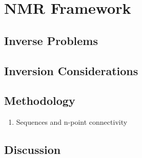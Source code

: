 
\chapter{NMR Framework}
\label{ch:03framework}

\FloatBarrier
\section{Inverse Problems}
\label{sec:inverse}


\FloatBarrier
\section{Inversion Considerations}
\label{sec:consider}


\FloatBarrier
\section{Methodology}
\label{sec:method}

\begin{enumerate}
    \item Sequences and n-point connectivity
\end{enumerate}


\FloatBarrier
\section{Discussion}
\label{sec:discuss03}